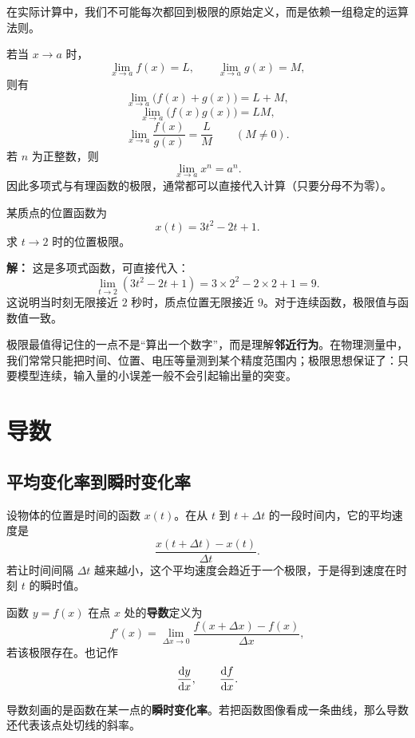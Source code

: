 在实际计算中，我们不可能每次都回到极限的原始定义，而是依赖一组稳定的运算法则。

\begin{theorem}
若当 $x\to a$ 时，
\[
  \lim_{x\to a}f(x)=L, \qquad \lim_{x\to a}g(x)=M,
\]
则有
\[
  \lim_{x\to a}\bigl(f(x)+g(x)\bigr)=L+M,
\]
\[
  \lim_{x\to a}\bigl(f(x)g(x)\bigr)=LM,
\]
\[
  \lim_{x\to a}\frac{f(x)}{g(x)}=\frac{L}{M} \qquad (M\ne 0).
\]
若 $n$ 为正整数，则
\[
  \lim_{x\to a}x^n = a^n.
\]
因此多项式与有理函数的极限，通常都可以直接代入计算（只要分母不为零）。
\end{theorem}

\begin{example}
某质点的位置函数为
\[
  x(t)=3t^2-2t+1.
\]
求 $t\to 2$ 时的位置极限。

\textbf{解：} 这是多项式函数，可直接代入：
\[
  \lim_{t\to 2}(3t^2-2t+1)=3\times 2^2-2\times 2+1=9.
\]
这说明当时刻无限接近 $2$ 秒时，质点位置无限接近 $9$。对于连续函数，极限值与函数值一致。
\end{example}

\begin{remark}
极限最值得记住的一点不是“算出一个数字”，而是理解\textbf{邻近行为}。在物理测量中，我们常常只能把时间、位置、电压等量测到某个精度范围内；极限思想保证了：只要模型连续，输入量的小误差一般不会引起输出量的突变。
\end{remark}

\section{导数}

\subsection{平均变化率到瞬时变化率}

设物体的位置是时间的函数 $x(t)$。在从 $t$ 到 $t+\Delta t$ 的一段时间内，它的平均速度是
\[
  \frac{x(t+\Delta t)-x(t)}{\Delta t}.
\]
若让时间间隔 $\Delta t$ 越来越小，这个平均速度会趋近于一个极限，于是得到速度在时刻 $t$ 的瞬时值。

\begin{definition}
函数 $y=f(x)$ 在点 $x$ 处的\textbf{导数}定义为
\[
  f'(x) = \lim_{\Delta x \to 0} \frac{f(x+\Delta x)-f(x)}{\Delta x},
\]
若该极限存在。也记作
\[
  \dv{y}{x}, \qquad \dv{f}{x}.
\]
\end{definition}

导数刻画的是函数在某一点的\textbf{瞬时变化率}。若把函数图像看成一条曲线，那么导数还代表该点处切线的斜率。

